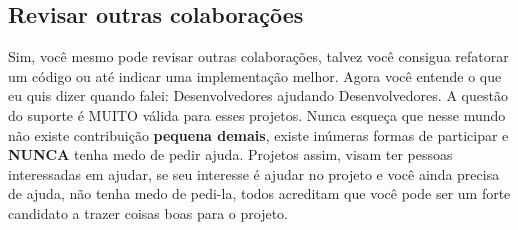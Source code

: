 \documentclass[a4paper,11pt]{article}
\begin{document}
\subsection{Revisar outras colaborações}
Sim, você mesmo pode revisar outras colaborações, talvez você consigua refatorar um código ou até indicar uma implementação melhor. Agora você entende o que eu quis dizer quando falei: Desenvolvedores ajudando Desenvolvedores. A questão do suporte é MUITO válida para esses projetos.\newline\newline
Nunca esqueça que nesse mundo não existe contribuição \textbf{pequena demais}, existe inúmeras formas de participar e \textbf{NUNCA} tenha medo de pedir ajuda. Projetos assim, visam ter pessoas interessadas em ajudar, se seu interesse é ajudar no projeto e você ainda precisa de ajuda, não tenha medo de pedi-la, todos acreditam que você pode ser um forte candidato a trazer coisas boas para o projeto.
\end{document}
